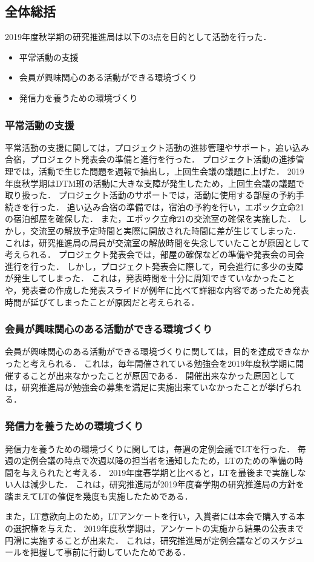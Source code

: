 \subsection*{全体総括}

2019年度秋学期の研究推進局は以下の3点を目的として活動を行った．
\begin{itemize}
\item 平常活動の支援
\item 会員が興味関心のある活動ができる環境づくり
\item 発信力を養うための環境づくり
\end{itemize}

\subsubsection*{平常活動の支援}
平常活動の支援に関しては，プロジェクト活動の進捗管理やサポート，追い込み合宿，プロジェクト発表会の準備と進行を行った．
プロジェクト活動の進捗管理では，活動で生じた問題を週報で抽出し，上回生会議の議題に上げた．
2019年度秋学期はDTM班の活動に大きな支障が発生したため，上回生会議の議題で取り扱った．
プロジェクト活動のサポートでは，活動に使用する部屋の予約手続きを行った．
追い込み合宿の準備では，宿泊の予約を行い，エポック立命21の宿泊部屋を確保した．
また，エポック立命21の交流室の確保を実施した．
しかし，交流室の解放予定時間と実際に開放された時間に差が生じてしまった．
これは，研究推進局の局員が交流室の解放時間を失念していたことが原因として考えられる．
プロジェクト発表会では，部屋の確保などの準備や発表会の司会進行を行った．
しかし，プロジェクト発表会に際して，司会進行に多少の支障が発生してしまった．
これは，発表時間を十分に周知できていなかったことや，発表者の作成した発表スライドが例年に比べて詳細な内容であったため発表時間が延びてしまったことが原因だと考えられる．

\subsubsection*{会員が興味関心のある活動ができる環境づくり} 
会員が興味関心のある活動ができる環境づくりに関しては，目的を達成できなかったと考えられる．
これは，毎年開催されている勉強会を2019年度秋学期に開催することが出来なかったことが原因である．
開催出来なかった原因としては，研究推進局が勉強会の募集を満足に実施出来ていなかったことが挙げられる．

\subsubsection*{発信力を養うための環境づくり} 
発信力を養うための環境づくりに関しては，毎週の定例会議でLTを行った．
毎週の定例会議の時点で次週以降の担当者を通知したため，LTのための準備の時間を与えられたと考える．
2019年度春学期と比べると，LTを最後まで実施しない人は減少した．
これは，研究推進局が2019年度春学期の研究推進局の方針を踏まえてLTの催促を幾度も実施したためである．

また，LT意欲向上のため，LTアンケートを行い，入賞者には本会で購入する本の選択権を与えた．
2019年度秋学期は，アンケートの実施から結果の公表まで円滑に実施することが出来た．
これは，研究推進局が定例会議などのスケジュールを把握して事前に行動していたためである．
